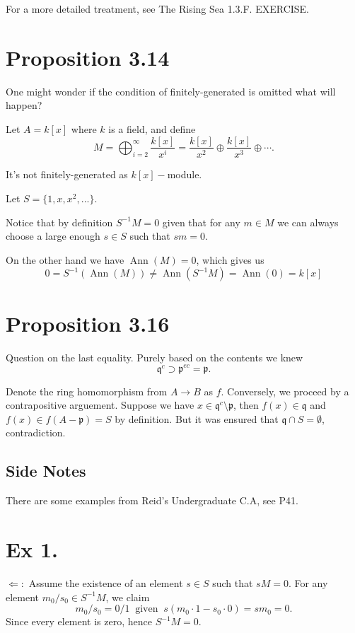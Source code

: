 For a more detailed treatment, see The Rising Sea 1.3.F. EXERCISE.

\section{Proposition 3.14}

One might wonder if the condition of finitely-generated is omitted what will happen?

Let $A=k[x]$ where $k$ is a field, and define 
$$M=\bigoplus_{i=2}^{\infty}\frac{k[x]}{x^i}=\frac{k[x]}{x^2}\oplus \frac{k[x]}{x^3}\oplus\cdots.$$

It's not finitely-generated as $k[x]-$module. 

Let $S=\{1,x,x^2,...\}$.

Notice that by definition $S^{-1}M=0$ given that for any $m\in M$ we can always choose a large enough $s\in S$ such that $sm=0$.

On the other hand we have $\operatorname{Ann}(M)=0$, which gives us
$$0=S^{-1}(\operatorname{Ann}(M))\neq \operatorname{Ann}(S^{-1}M)=\operatorname{Ann}(0)=k[x]$$

\section{Proposition 3.16} 

Question on the last equality. Purely based on the contents we knew $$\mathfrak q^c \supset \mathfrak p^{ec}=\mathfrak p.$$

Denote the ring homomorphism from $A\to B$ as $f$.
Conversely, we proceed by a contrapositive arguement. Suppose we have $x\in \mathfrak q^c\setminus \mathfrak p$, then $f(x)\in \mathfrak q$ and $f(x)\in f(A-\mathfrak p)=S$ by definition. But it was ensured that $\mathfrak q\cap S=\emptyset$, contradiction.

\subsection{Side Notes}

There are some examples from Reid's Undergraduate C.A, see P41. 

\section{Ex 1.}\label{Atiyah Chapter 3 Ex 1.}

$\Leftarrow:$ Assume the existence of an element $s\in S$ such that $sM=0$. For any element $m_0/s_0\in S^{-1}M$, we claim 
$$m_0/s_0=0/1 ~\text{ given }~ s(m_0\cdot 1 - s_0\cdot 0)=sm_0=0.$$Since every element is zero, hence $S^{-1}M=0$. 

